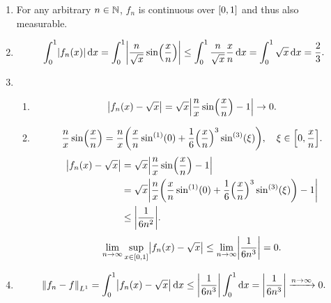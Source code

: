 \documentclass{exercise}
\begin{document}
	\begin{enumerate}
		\item For any arbitrary \(n \in \N\), \(f_n\) is continuous over \(\brackets*{0, 1}\) and thus also measurable.
		\item
		\[
			\int_0^1 \absolute*{f_n\parentheses*{x}}\d x = \int_0^1 \absolute*{\frac{n}{\sqrt{x}}\sin\parentheses*{\frac{x}{n}}} \le \int_0^1 \frac{n}{\sqrt{x}}\frac{x}{n}\d x = \int_0^1 \sqrt{x}\d x = \frac{2}{3}.
		\]
		\item
		\begin{enumerate}
			\item
			\[
				\absolute*{f_n\parentheses*{x} - \sqrt{x}} = \sqrt{x}\absolute*{\frac{n}{x}\sin\parentheses*{\frac{x}{n}} - 1} \to 0.
			\]
			\item
			\[
				\frac{n}{x}\sin\parentheses*{\frac{x}{n}} = \frac{n}{x}\parentheses*{\frac{x}{n}\sin^{\parentheses*{1}}\parentheses*{0} + \frac{1}{6}\parentheses*{\frac{x}{n}}^3 \sin^{\parentheses*{3}}\parentheses*{\xi}}, \quad \xi \in \brackets*{0, \frac{x}{n}}.
			\]
			\begin{align*}
				\absolute*{f_n\parentheses*{x} - \sqrt{x}} &= \sqrt{x}\absolute*{\frac{n}{x}\sin\parentheses*{\frac{x}{n}} - 1}\\
				&= \sqrt{x}\absolute*{\frac{n}{x}\parentheses*{\frac{x}{n}\sin^{\parentheses*{1}}\parentheses*{0} + \frac{1}{6}\parentheses*{\frac{x}{n}}^3 \sin^{\parentheses*{3}}\parentheses*{\xi}} - 1}\\
				&\le \absolute*{\frac{1}{6n^2}}.
			\end{align*}
			\[
				\lim_{n \to \infty}\sup_{x \in \brackets*{0, 1}}\absolute*{f_n\parentheses*{x} - \sqrt{x}} \le \lim_{n \to \infty}\absolute*{\frac{1}{6n^3}} = 0.
			\]
		\end{enumerate}
		\item
		\[
			\norm*{f_n - f}_{L^1} = \int_0^1 \absolute*{f_n\parentheses*{x} - \sqrt{x}}\d x \le \absolute*{\frac{1}{6n^3}}\int_0^1 \d x = \absolute*{\frac{1}{6n^3}} \xrightarrow{n \to \infty} 0.
		\]
	\end{enumerate}


	\section{}
\end{document}
